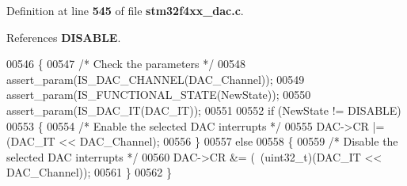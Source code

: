 Definition at line \textbf{ 545} of file \textbf{ stm32f4xx\+\_\+dac.\+c}.



References \textbf{ D\+I\+S\+A\+B\+LE}.


\begin{DoxyCode}
00546 \{
00547   \textcolor{comment}{/* Check the parameters */}
00548   assert_param(IS_DAC_CHANNEL(DAC\_Channel));
00549   assert_param(IS_FUNCTIONAL_STATE(NewState));
00550   assert_param(IS_DAC_IT(DAC\_IT)); 
00551 
00552   \textcolor{keywordflow}{if} (NewState != DISABLE)
00553   \{
00554     \textcolor{comment}{/* Enable the selected DAC interrupts */}
00555     DAC->CR |=  (DAC\_IT << DAC\_Channel);
00556   \}
00557   \textcolor{keywordflow}{else}
00558   \{
00559     \textcolor{comment}{/* Disable the selected DAC interrupts */}
00560     DAC->CR &= (~(uint32\_t)(DAC\_IT << DAC\_Channel));
00561   \}
00562 \}
\end{DoxyCode}
